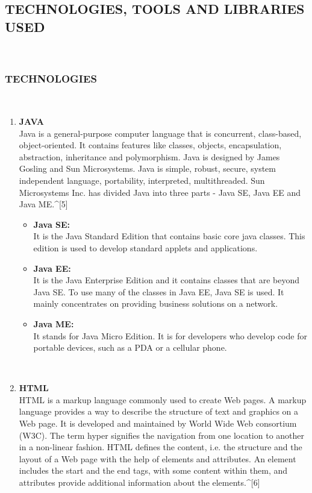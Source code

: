 \documentclass[12pt,a4paper]{article}
\begin{document}
\subsection{TECHNOLOGIES, TOOLS AND LIBRARIES USED}
\\
\subsubsection{TECHNOLOGIES}
\\
\begin{enumerate}
\item \textbf{JAVA}
\\
\hspace{0.7 cm} Java is a general-purpose computer language that is concurrent, class-based, object-oriented. It contains features like classes, objects, encapsulation, abstraction, inheritance and polymorphism. Java is designed by James Gosling and Sun Microsystems. Java is simple, robust, secure, system independent language, portability, interpreted, multithreaded. Sun Microsystems Inc. has divided Java into three parts - Java SE, Java EE and Java ME.^{[5]}
\\
\begin{itemize}
\\
\item \textbf{Java SE:}
\\
\hspace{0.7 cm} It is the Java Standard Edition that contains basic core java classes. This edition is used to develop standard applets and applications.
\\
\item \textbf{Java EE:}
\\
\hspace{0.7 cm} It is the Java Enterprise Edition and it contains classes that are beyond Java SE. To use many of the classes in Java EE, Java SE is used. It mainly concentrates on providing business solutions on a network.
\\
\item \textbf{Java ME:}
\\
\hspace{0.7 cm} It stands for Java Micro Edition. It is for developers who develop code for portable devices, such as a PDA or a cellular phone.
\\
\end{itemize}
\\
\item \textbf{HTML}
\\
\hspace{0.7 cm} HTML is a markup language commonly used to create Web pages. A markup language provides a way to describe the structure of text and graphics on a Web page. It is developed and maintained by World Wide Web consortium (W3C). The term hyper signifies the navigation from one location to another in a non-linear fashion. HTML defines the content, i.e. the structure and the layout of a Web page with the help of elements and attributes. An element includes the start and the end tags, with some content within them, and attributes provide additional information about the elements.^{[6]}

\end{enumerate}
\end{document}
